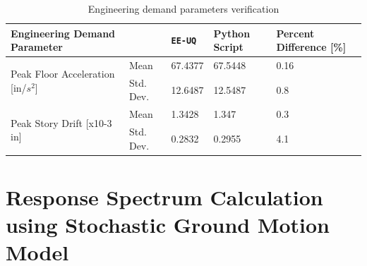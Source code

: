 \begin{table}[hbt!]                 
  \centering
\begin{adjustbox}{max width=\textwidth}            
  \begin{tabular}{lllll}                    
    \toprule          
      Engineering Demand Parameter &	 & \texttt{EE-UQ}	& Python Script	 & Percent Difference [\%]  \\ \hline
    
	\multirow{2}{*}{Peak Floor Acceleration [in/$s^2$]} 
	 & Mean &	67.4377	& 67.5448	& 0.16 \\
      & Std. Dev.	& 12.6487	 & 12.5487	& 0.8 \\ \hline
      
      \multirow{2}{*}{Peak Story Drift [x10-3 in]} 
      & Mean &	1.3428 &	1.347 &	0.3 \\
      & Std. Dev.	& 0.2832 &	0.2955	& 4.1	 \\

      \bottomrule      
                            
  \end{tabular}
\end{adjustbox}
  \caption{Engineering demand parameters verification}             
  \label{tab:edp}                 
\end{table}

\section{Response Spectrum Calculation using Stochastic Ground Motion Model}

